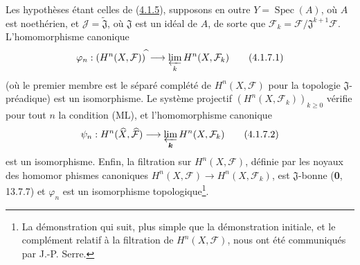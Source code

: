 \begin{corollary}[4.1.7]
\label{III.4.1.7-fr}
Les hypothèses étant celles de \textup{(\hyperref[III.4.1.5-fr]{4.1.5})}, supposons
en outre $Y=\operatorname{Spec}(A)$, où $A$ est noethérien, et
$\mathcal J=\widetilde{\mathfrak J}$, où $\mathfrak J$ est un idéal de
$A$, de sorte que
$\mathcal F_k=\mathcal F/\mathfrak J^{k+1}\mathcal F$.
L'homomorphisme canonique
\[
\varphi_n:(H^n(X,\mathcal F))^{\widehat{\,}}
\longrightarrow\varprojlim_kH^n(X,\mathcal F_k)
\tag{4.1.7.1}\label{III.4.1.7.1-fr}
\]
(où le premier membre est le séparé complété de $H^n(X,\mathcal F)$ pour
la topologie $\mathfrak J$-préadique) est un isomorphisme. Le système
projectif $(H^n(X,\mathcal F_k))_{k\geq0}$ vérifie pour tout $n$ la
condition \textup{(ML)}, et l'homomorphisme canonique
\[
\psi_n:H^n(\widehat X,\widehat{\mathcal F})
\longrightarrow\varprojlim_{\boldsymbol{k}}H^n(X,\mathcal F_k)
\tag{4.1.7.2}\label{III.4.1.7.2-fr}
\]
est un isomorphisme. Enfin, la filtration sur $H^n(X,\mathcal F)$, définie
par les noyaux des homomor%
phismes canoniques
$H^n(X,\mathcal F)\to H^n(X,\mathcal F_k)$, est $\mathfrak J$-bonne
\textup{(\textbf{0}, 13.7.7)} et $\varphi_n$ est un isomorphisme topologique\footnote{La démonstration qui suit, plus simple que la démonstration
initiale, et le complément relatif à la filtration de
$H^n(X,\mathcal F)$, nous ont été communiqués par J.-P. Serre.}.
\end{corollary}

